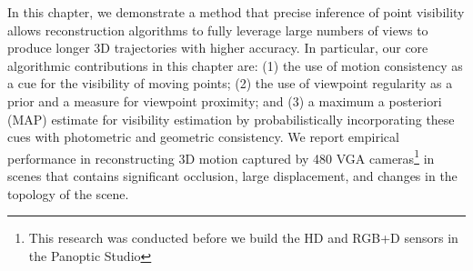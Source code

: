 

In this chapter, we demonstrate a method that precise inference of point visibility allows reconstruction algorithms to fully leverage large numbers of views to produce longer 3D trajectories with higher accuracy. In particular, our core algorithmic contributions in this chapter are: (1) the use of motion consistency as a cue for the visibility of moving points; (2) the use of viewpoint regularity as a prior and a measure for viewpoint proximity; and (3) a maximum a posteriori (MAP) estimate for visibility estimation by probabilistically incorporating these cues with photometric and geometric consistency. We report empirical performance in reconstructing 3D motion captured by 480 VGA cameras\footnote{This research was conducted before we build the HD and RGB+D sensors in the Panoptic Studio} in scenes that contains significant occlusion, large displacement, and changes in the topology of the scene.

